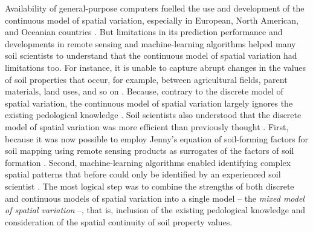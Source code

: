 Availability of general-purpose computers fuelled the use and development of the continuous model of
spatial variation, especially in European, North American, and Oceanian countries
\cite{HeuvelinkEtAl2001, McBratneyEtAl2003, ScullEtAl2003}. But limitations in its prediction
performance and developments in remote sensing and machine-learning algorithms helped many soil
scientists to understand that the continuous model of spatial variation had limitations too. For
instance, it is unable to capture abrupt changes in the values of soil properties that occur, for
example, between agricultural fields, parent materials, land uses, and so on
\cite{SteinEtAl1988, VoltzEtAl1990}. Because, contrary to the discrete model of spatial variation, the
continuous model of spatial variation largely ignores the existing pedological knowledge
\cite{Grunwald2009, Lark2012}. Soil scientists also understood that the discrete model of spatial
variation was more efficient than previously thought \cite{BregtEtAl1987}. First, because it was now
possible to employ Jenny's equation of soil-forming factors for soil mapping using remote sensing
products as surrogates of the factors of soil formation \cite{MooreEtAl1993}. Second, machine-learning
algorithms enabled identifying complex spatial patterns that before could only be identified by an
experienced soil scientist \cite{McKenzieEtAl1999}. The most logical step was to combine the
strengths of both discrete and continuous models of spatial variation into a single model -- the
\emph{mixed model of spatial variation} --, that is, inclusion of the existing pedological
knowledge and consideration of the spatial continuity of soil property values.

